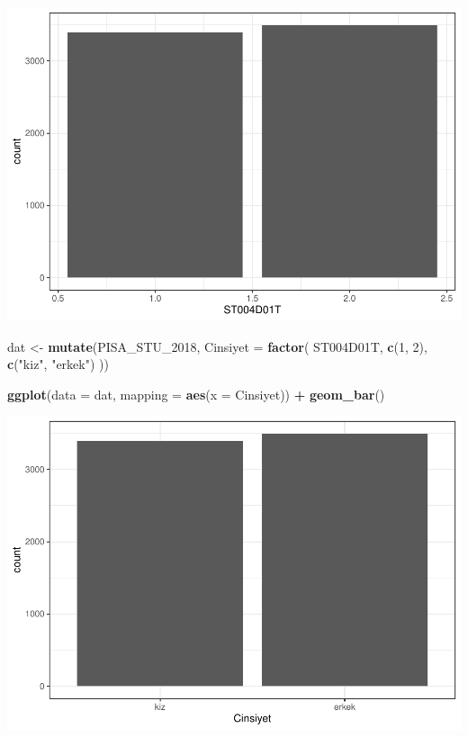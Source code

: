 \documentclass[
  oneside]{book}
\newenvironment{Shaded}{\begin{snugshade}}{\end{snugshade}}
\newcommand{\AttributeTok}[1]{\textcolor[rgb]{0.13,0.29,0.53}{#1}}
\newcommand{\DecValTok}[1]{\textcolor[rgb]{0.00,0.00,0.81}{#1}}
\newcommand{\FunctionTok}[1]{\textcolor[rgb]{0.13,0.29,0.53}{\textbf{#1}}}
\newcommand{\NormalTok}[1]{#1}
\newcommand{\OtherTok}[1]{\textcolor[rgb]{0.56,0.35,0.01}{#1}}
\newcommand{\SpecialCharTok}[1]{\textcolor[rgb]{0.81,0.36,0.00}{\textbf{#1}}}
\newcommand{\StringTok}[1]{\textcolor[rgb]{0.31,0.60,0.02}{#1}}
\begin{document}
\begin{center}\includegraphics[width=1\linewidth]{15-betimleyici-istatistik_files/figure-latex/unnamed-chunk-58-1} \end{center}

\begin{Shaded}
\begin{Highlighting}[]
\NormalTok{dat }\OtherTok{\textless{}{-}} \FunctionTok{mutate}\NormalTok{(PISA\_STU\_2018, }\AttributeTok{Cinsiyet =} \FunctionTok{factor}\NormalTok{(}
\NormalTok{  ST004D01T,}
  \FunctionTok{c}\NormalTok{(}\DecValTok{1}\NormalTok{, }\DecValTok{2}\NormalTok{),}
  \FunctionTok{c}\NormalTok{(}\StringTok{"kiz"}\NormalTok{, }\StringTok{"erkek"}\NormalTok{)}
\NormalTok{))}

\FunctionTok{ggplot}\NormalTok{(}\AttributeTok{data =}\NormalTok{ dat, }\AttributeTok{mapping =} \FunctionTok{aes}\NormalTok{(}\AttributeTok{x =}\NormalTok{ Cinsiyet)) }\SpecialCharTok{+}
  \FunctionTok{geom\_bar}\NormalTok{()}
\end{Highlighting}
\end{Shaded}

\begin{center}\includegraphics[width=1\linewidth]{15-betimleyici-istatistik_files/figure-latex/unnamed-chunk-59-1} \end{center}
\end{document}
